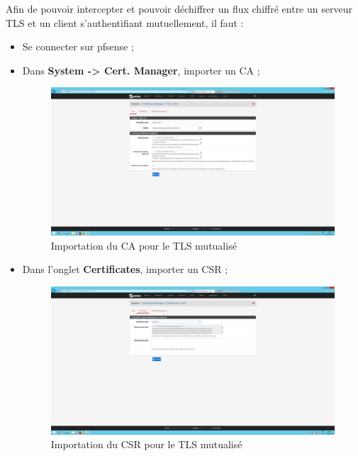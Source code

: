 Afin de pouvoir intercepter et pouvoir déchiffrer un flux chiffré entre un serveur TLS et un client s'authentifiant mutuellement, il faut :
\begin{itemize}
    \item Se connecter sur pfsense ;
    \item Dans \textbf{System -> Cert. Manager}, importer un CA ;
    \begin{figure}[h!]
	    \begin{center}
		    \includegraphics[scale=0.2]{Interception_Screenshots/mut03.png}
		    \caption{Importation du CA pour le TLS mutualisé}
	    \end{center}
    \end{figure}
    \FloatBarrier
    
    \item Dans l'onglet \textbf{Certificates}, importer un CSR ;
    \begin{figure}[h!]
	    \begin{center}
		    \includegraphics[scale=0.2]{Interception_Screenshots/mut04.png}
		    \caption{Importation du CSR pour le TLS mutualisé}
	    \end{center}
    \end{figure}
    \FloatBarrier
    

\end{itemize}
